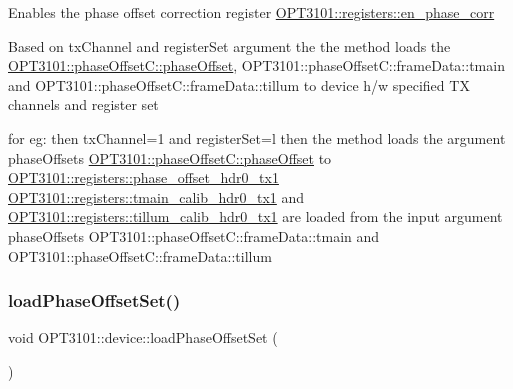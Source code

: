\begin{DoxyItemize}
\item Enables the phase offset correction register \mbox{\hyperlink{class_o_p_t3101_1_1registers_a66984616af1af7f24eaf7226e8d64c11}{O\+P\+T3101\+::registers\+::en\+\_\+phase\+\_\+corr}}
\item Based on tx\+Channel and register\+Set argument the the method loads the \mbox{\hyperlink{class_o_p_t3101_1_1phase_offset_c_addeef913546f1c431b4fd189478884f9}{O\+P\+T3101\+::phase\+Offset\+C\+::phase\+Offset}}, O\+P\+T3101\+::phase\+Offset\+C\+::frame\+Data\+::tmain and O\+P\+T3101\+::phase\+Offset\+C\+::frame\+Data\+::tillum to device h/w specified TX channels and register set ~\newline

\item for eg\+: then tx\+Channel=1 and register\+Set=\textquotesingle{}l\textquotesingle{} then the method loads the argument phase\+Offset\textquotesingle{}s \mbox{\hyperlink{class_o_p_t3101_1_1phase_offset_c_addeef913546f1c431b4fd189478884f9}{O\+P\+T3101\+::phase\+Offset\+C\+::phase\+Offset}} to \mbox{\hyperlink{class_o_p_t3101_1_1registers_a4097670bfd34c50f64b7644626bb3390}{O\+P\+T3101\+::registers\+::phase\+\_\+offset\+\_\+hdr0\+\_\+tx1}} \mbox{\hyperlink{class_o_p_t3101_1_1registers_a68724aced807ba68873f5a6375bb611e}{O\+P\+T3101\+::registers\+::tmain\+\_\+calib\+\_\+hdr0\+\_\+tx1}} and \mbox{\hyperlink{class_o_p_t3101_1_1registers_aaa41e9820a7a006305ef538a8e3ac657}{O\+P\+T3101\+::registers\+::tillum\+\_\+calib\+\_\+hdr0\+\_\+tx1}} are loaded from the input argument phase\+Offset\textquotesingle{}s O\+P\+T3101\+::phase\+Offset\+C\+::frame\+Data\+::tmain and O\+P\+T3101\+::phase\+Offset\+C\+::frame\+Data\+::tillum 
\end{DoxyItemize}\mbox{\label{class_o_p_t3101_1_1device_a9fed055b5998d93bd37f26388ec8b0a8}} 
\subsubsection{\texorpdfstring{load\+Phase\+Offset\+Set()}{loadPhaseOffsetSet()}}
{\footnotesize\ttfamily void O\+P\+T3101\+::device\+::load\+Phase\+Offset\+Set (\begin{DoxyParamCaption}{ }\end{DoxyParamCaption})}



